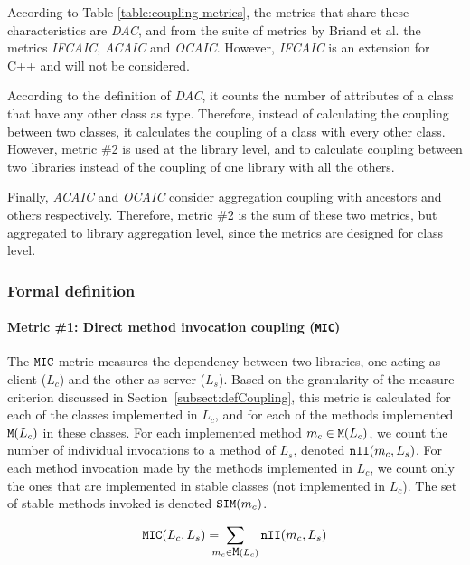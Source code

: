According to Table \ref{table:coupling-metrics}, the metrics that share these characteristics are \textit{DAC}, and from the suite of metrics by Briand et al. \cite{briand1997investigation} the metrics \textit{IFCAIC}, \textit{ACAIC} and \textit{OCAIC}. However, \textit{IFCAIC} is an extension for C++ and will not be considered.

According to the definition of \textit{DAC}, it counts the number of attributes of a class that have any other class as type. Therefore, instead of calculating the coupling between two classes, it calculates the coupling of a class with every other class. However, metric \#2 is used at the library level, and to calculate coupling between two libraries instead of the coupling of one library with all the others.

Finally, \textit{ACAIC} and \textit{OCAIC} consider aggregation coupling with ancestors and others respectively. Therefore, metric  \#2 is the sum of these two metrics, but aggregated to library aggregation level, since the metrics are designed for class level.

\subsubsection{Formal definition}\label{subsec:metric-definition}

\paragraph{Metric \#1: Direct method invocation coupling (\texttt{MIC})}
The $\verb|MIC|$ metric measures the dependency between two libraries, one acting as client ($L_c$) and the other as server ($L_s$).
Based on the granularity of the measure criterion discussed in Section~\ref{subsect:defCoupling}, this metric is calculated for each of the classes implemented in $L_c$, and for each of the methods implemented $\verb|M|(L_c)$ in these classes. For each implemented method  $m_c \in \verb|M|(L_c)$, we count the number of individual invocations to a method of $L_s$, denoted $\verb|nII|(m_c,L_s)$. For each method invocation made by the methods implemented in $L_c$, we count only the ones that are implemented in stable classes (not implemented in $L_c$). The set of stable methods invoked is denoted $\verb|SIM|(m_c)$.

\begin{equation}
\label{eqn:mic}
\verb|MIC|(L_c, L_s) =\!\!\!\!\! \sum_{m_c \in \verb|M|(L_c)} \verb|nII|(m_c, L_s)
\end{equation}


